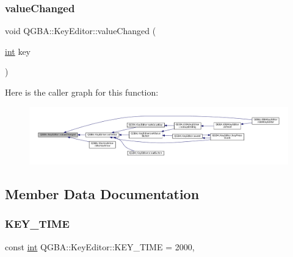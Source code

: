 \subsubsection{\texorpdfstring{value\+Changed}{valueChanged}}
{\footnotesize\ttfamily void Q\+G\+B\+A\+::\+Key\+Editor\+::value\+Changed (\begin{DoxyParamCaption}\item[{\mbox{\hyperlink{ioapi_8h_a787fa3cf048117ba7123753c1e74fcd6}{int}}}]{key }\end{DoxyParamCaption})\hspace{0.3cm}{\ttfamily [signal]}}

Here is the caller graph for this function\+:
\nopagebreak
\begin{figure}[H]
\begin{center}
\leavevmode
\includegraphics[width=350pt]{class_q_g_b_a_1_1_key_editor_a060ef43bb32ff534083db12143ffad02_icgraph}
\end{center}
\end{figure}


\subsection{Member Data Documentation}
\mbox{\label{class_q_g_b_a_1_1_key_editor_a3ca307fa07d989b5f52cbfb78d4e0f47}} 
\subsubsection{\texorpdfstring{K\+E\+Y\+\_\+\+T\+I\+ME}{KEY\_TIME}}
{\footnotesize\ttfamily const \mbox{\hyperlink{ioapi_8h_a787fa3cf048117ba7123753c1e74fcd6}{int}} Q\+G\+B\+A\+::\+Key\+Editor\+::\+K\+E\+Y\+\_\+\+T\+I\+ME = 2000\hspace{0.3cm}{\ttfamily [static]}, {\ttfamily [private]}}

\mbox{\label{class_q_g_b_a_1_1_key_editor_a3ad5284b598c4aa5aa288f62638e72ca}} 
